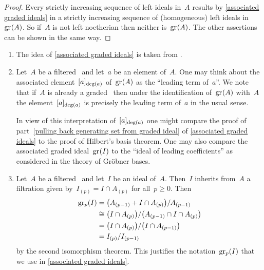 \begin{proof}
	Every strictly increasing sequence of left ideals in~$A$ results by \cref{associated graded ideals} in a strictly increasing sequence of (homogeneous) left ideals in~$\gr(A)$.
	So if~$A$ is not left noetherian then neither is~$\gr(A)$.
	The other assertions can be shown in the same way.
\end{proof}


\begin{remark}
	\leavevmode
	\begin{enumerate}
		\item
			The idea of \cref{associated graded ideals} is taken from \cite[6.7,~6.9]{mcconnel_noncommutative_noetherian_rings}.
		\item
			Let~$A$ be a filtered~\algebra{$\kf$} and let~$a$ be an element of~$A$.
			One may think about the associated element~$\lbrack a\rbrack_{\deg(a)}$ of~$\gr(A)$ as the \enquote{leading term of~$a$}.
			We note that if~$A$ is already a graded~{\algebra{$\kf$}} then under the identification of~$\gr(A)$ with~$A$ the element~$\lbrack a\rbrack_{\deg(a)}$ is precisely the leading term of~$a$ in the usual sense.
			
			In view of this interpretation of~$\lbrack a\rbrack_{\deg(a)}$ one might compare the proof of part~\ref{pulling back generating set from graded ideal} of \cref{associated graded ideals} to the proof of Hilbert’s basis theorem.
			One may also compare the associated graded ideal~$\gr(I)$ to the \enquote{ideal of leading coefficients} as considered in the theory of Gröbner bases.
		\item
			Let~$A$ be a filtered~\algebra{$\kf$} and let~$I$ be an ideal of~$A$.
			Then~$I$ inherits from~$A$ a filtration given by~$I_{(p)} = I \cap A_{(p)}$ for all~$p \geq 0$.
			Then
			\begin{align*}
				\gr[p](I)
				&=
				\bigl(A_{(p-1)} + I \cap A_{(p)} \bigr) / A_{(p-1)}
				\\
				&\cong
				\bigl( I \cap A_{(p)} \bigr) / \bigl( A_{(p-1)} \cap I \cap A_{(p)} \bigr)
				\\
				&=
				\bigl( I \cap A_{(p)} \bigr) / \bigl( I \cap A_{(p-1)} \bigr)
				\\
				&=
				I_{(p)} / I_{(p-1)}
			\end{align*}
			by the second isomorphism theorem.
			This justifies the notation~$\gr[p](I)$ that we use in \cref{associated graded ideals}.
	\end{enumerate}
\end{remark}

